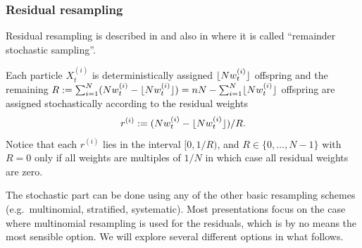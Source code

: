 \subsubsection{Residual resampling \seb{$\checkmark$} }%
Residual resampling is described in \textcite{liu1998} and also in \textcite{whitley1994} where it is called ``remainder stochastic sampling''.

Each particle $X_{t}^{(i)}$ is deterministically assigned $\lfloor N w_t^{(i)} \rfloor$ offspring and the remaining $R := \sum_{i=1}^N ( Nw_t^{(i)} - \lfloor N w_t^{(i)} \rfloor) = n                           N- \sum_{i=1}^N \lfloor N w_t^{(i)} \rfloor$ offspring are assigned stochastically according to the residual weights
\begin{equation*}
r^{(i)} := ( Nw_t^{(i)} - \lfloor N w_t^{(i)} \rfloor) /R .
\end{equation*}
Notice that each $r^{(i)}$ lies in the interval $[0, 1/R)$, and $R\in\{0,\dots,N-1\}$ with $R=0$ only if all weights are multiples of $1/N$ in which case all residual weights are zero.

The stochastic part can be done using any of the other basic resampling schemes (e.g.\ multinomial, stratified, systematic). Most presentations focus on the case where multinomial resampling is used for the residuals, which is by no means the most sensible option. We will explore several different options in what follows.




